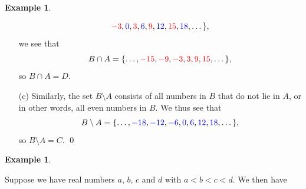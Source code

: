 \documentclass[a4paper]{book}
\newcommand{\RED}[1]{{\color{red}#1}}
\newcommand{\BLUE}[1]{{\color{blue}#1}}
\newcommand{\C}         {{\mathbb{C}}}
\newcommand{\sm}        {\setminus}
\renewcommand{\:}{\colon}
\newcommand{\bilabel}[1]{\hypertarget{#1}{\label{#1}}}
\theoremstyle{definition}
\newtheorem{example}[theorem]{Example}
\begin{document}
\begin{example}
\begin{itemize}
\[            \RED{-3},\BLUE{0},\RED{3},\BLUE{6},\RED{9},\BLUE{12},
            \RED{15},\BLUE{18},\dotsc\},
   \]
   we see that 
   \[ B\cap A = \{ \dotsc,\RED{-15},\RED{-9},\RED{-3},
                   \RED{3},\RED{9},\RED{15},\dotsc \},
   \]
   so $B\cap A=D$.
  \item[(c)] Similarly, the set $B\sm A$ consists of all numbers in
   $B$ that do not lie in $A$, or in other words, all even numbers in
   $B$.  We thus see that
   \[ B\sm A = \{ \dotsc,\BLUE{-18},\BLUE{-12},\BLUE{-6},\BLUE{0},
                   \BLUE{6},\BLUE{12},\BLUE{18},\dotsc \},
   \]
   so $B\sm A=C$. \qed
 \end{itemize}
\end{example}

\begin{example}\bilabel{eg-interval-bool}
 Suppose we have real numbers $a$, $b$, $c$ and $d$ with $a<b<c<d$.
 We then have
 { \def\X{5.4}\def\A{0.75}\def\B{2.25}\def\C{3.15}\def\D{4.95}\def\Y{0}
 \newcommand{\newset}[2]{%
  \def\Y{-#1}%
  \draw[black,dotted] (0,\Y/2) -- (\X,\Y/2);%
  \draw (6.3,\Y/2) node[anchor=west]{$#2$};%
 }
 \newcommand{\pp}[1]{\fill (#1,\Y/2) circle(0.05);}
 \newcommand{\oo}[2]{\draw[ultra thick,red] (#1+0.09,\Y/2) -- (#2-0.09,\Y/2);}
 \newcommand{\oc}[2]{\draw[ultra thick,red] (#1+0.09,\Y/2) -- (#2,\Y/2); \pp{#2}}
 \newcommand{\co}[2]{\draw[ultra thick,red] (#1,\Y/2) -- (#2-0.09,\Y/2); \pp{#1}}
 \newcommand{\cc}[2]{\draw[ultra thick,red] (#1,\Y/2) -- (#2,\Y/2); \pp{#1}\pp{#2}}

}
\end{example}
\end{document}
